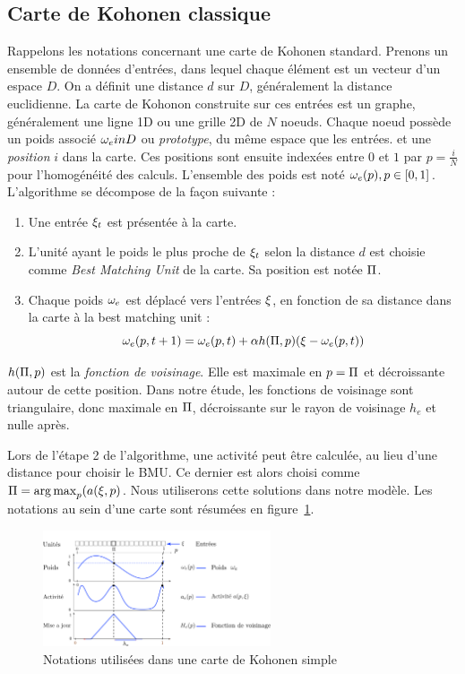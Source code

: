 \subsection{Carte de Kohonen classique}

Rappelons les notations concernant une carte de Kohonen standard. Prenons un ensemble de données d'entrées, dans lequel chaque élément est un vecteur d'un espace $D$. On a définit une distance $d$ sur $D$, généralement la distance euclidienne.
La carte de Kohonon construite sur ces entrées est un graphe, généralement une ligne 1D ou une grille 2D de $N$ noeuds. Chaque noeud possède un poids associé $\omega_e in D$ ou \emph{prototype}, du même espace que les entrées. et une \emph{position} $i$ dans la carte. Ces positions sont ensuite indexées entre $0$ et $1$ par $p= \frac{i}{N}$ pour l'homogénéité des calculs. 
L'ensemble des poids est noté ${\omega_e(p), p \in [0,1]}$. 
L'algorithme se décompose de la façon suivante :

\begin{enumerate}
\item Une entrée $\xi_t$ est présentée à la carte.
\item L'unité ayant le poids le plus proche de $\xi_t$ selon la distance $d$ est choisie comme \emph{Best Matching Unit} de la carte. Sa position est notée $\Pi$.
\item Chaque poids $\omega_e$ est déplacé vers l'entrées $\xi$, en fonction de sa distance dans la carte à la best matching unit : 
\begin{equation}
\omega_e(p,t+1) = \omega_e(p,t) + \alpha h(\Pi,p)(\xi - \omega_e(p,t))
\label{eq:update}
\end{equation}

\end{enumerate}

$h(\Pi,p)$ est la \emph{fonction de voisinage}. Elle est maximale en $p = \Pi$ et décroissante autour de cette position. Dans notre étude, les fonctions de voisinage sont triangulaire, donc maximale en $\Pi$, décroissante sur le rayon de voisinage $h_e$ et nulle après.

Lors de l'étape 2 de l'algorithme, une activité peut être calculée, au lieu d'une distance pour choisir le BMU. Ce dernier est alors choisi comme $\Pi = \operatorname*{arg\,max}_p (a(\xi,p)$. Nous utiliserons cette solutions dans notre modèle. Les notations au sein d'une carte sont résumées en figure~\ref{fig:one_map_not}.

\begin{figure}
\centering
\includegraphics[width=0.6\textwidth]{one_map_one_layer.pdf}
\caption{Notations utilisées dans une carte de Kohonen simple}
\label{fig:one_map_not}
\end{figure}

